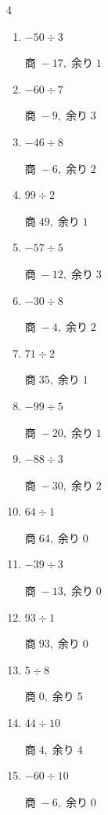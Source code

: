\begin{multicols}{4}
\begin{enumerate}
  \item $-50 \div 3$

        $商\; -17,\; 余り\; 1$

  \item $-60 \div 7$

        $商\; -9,\; 余り\; 3$

  \item $-46 \div 8$

        $商\; -6,\; 余り\; 2$

  \item $99 \div 2$

        $商\; 49,\; 余り\; 1$

\columnbreak %

  \item $-57 \div 5$

        $商\; -12,\; 余り\; 3$

  \item $-30 \div 8$

        $商\; -4,\; 余り\; 2$

  \item $71 \div 2$

        $商\; 35,\; 余り\; 1$

  \item $-99 \div 5$

        $商\; -20,\; 余り\; 1$

  \item $-88 \div 3$

        $商\; -30,\; 余り\; 2$

  \item $64 \div 1$

        $商\; 64,\; 余り\; 0$

  \item $-39 \div 3$

        $商\; -13,\; 余り\; 0$

  \item $93 \div 1$

        $商\; 93,\; 余り\; 0$

  \item $5 \div 8$

        $商\; 0,\; 余り\; 5$

  \item $44 \div 10$

        $商\; 4,\; 余り\; 4$

  \item $-60 \div 10$

        $商\; -6,\; 余り\; 0$


\end{enumerate}
\end{multicols}

